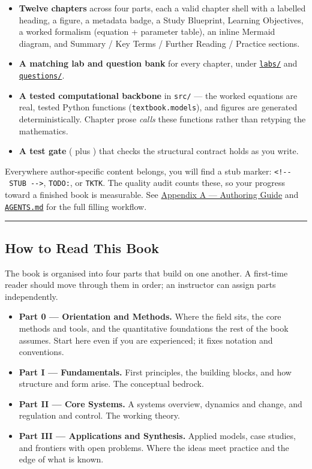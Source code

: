 \documentclass[
]{article}
\providecommand{\tightlist}{%
  \setlength{\itemsep}{0pt}\setlength{\parskip}{0pt}}
\theoremstyle{plain}
\theoremstyle{definition}
\begin{document}
\begin{itemize}
\tightlist
\item
  \textbf{Twelve chapters} across four parts, each a valid chapter shell
  with a labelled heading, a figure, a metadata badge, a Study
  Blueprint, Learning Objectives, a worked formalism (equation +
  parameter table), an inline Mermaid diagram, and Summary / Key Terms /
  Further Reading / Practice sections.
\item
  \textbf{A matching lab and question bank} for every chapter, under
  \href{labs/}{\texttt{labs/}} and
  \href{questions/}{\texttt{questions/}}.
\item
  \textbf{A tested computational backbone} in \texttt{src/} --- the
  worked equations are real, tested Python functions
  (\texttt{textbook.models}), and figures are generated
  deterministically. Chapter prose \emph{calls} these functions rather
  than retyping the mathematics.
\item
  \textbf{A test gate} (
  plus ) that checks the
  structural contract holds as you write.
\end{itemize}

Everywhere author-specific content belongs, you will find a stub marker:
\texttt{\textless{}!-\/-\ STUB\ -\/-\textgreater{}}, \texttt{TODO:}, or
\texttt{TKTK}. The quality audit counts these, so your progress toward a
finished book is measurable. See
\href{appendices/appendix_authoring_guide.md}{Appendix A --- Authoring
Guide} and \href{AGENTS.md}{\texttt{AGENTS.md}} for the full filling
workflow.

\begin{center}\rule{0.5\linewidth}{0.5pt}\end{center}

\subsection{How to Read This Book}\label{how-to-read-this-book}

The book is organised into four parts that build on one another. A
first-time reader should move through them in order; an instructor can
assign parts independently.

\begin{itemize}
\tightlist
\item
  \textbf{Part 0 --- Orientation and Methods.} Where the field sits, the
  core methods and tools, and the quantitative foundations the rest of
  the book assumes. Start here even if you are experienced; it fixes
  notation and conventions.
\item
  \textbf{Part I --- Fundamentals.} First principles, the building
  blocks, and how structure and form arise. The conceptual bedrock.
\item
  \textbf{Part II --- Core Systems.} A systems overview, dynamics and
  change, and regulation and control. The working theory.
\item
  \textbf{Part III --- Applications and Synthesis.} Applied models, case
  studies, and frontiers with open problems. Where the ideas meet
  practice and the edge of what is known.
\end{itemize}
\end{document}
